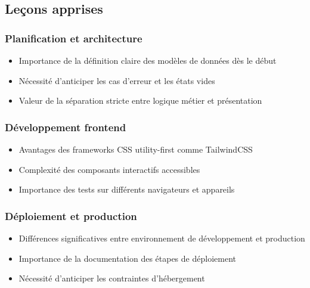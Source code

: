 \documentclass[a4paper,11pt]{article}
\begin{document}
        \subsection{Leçons apprises}

            \subsubsection{Planification et architecture}
                \begin{itemize}
                    \item Importance de la définition claire des modèles de données dès le début
                    \item Nécessité d'anticiper les cas d'erreur et les états vides
                    \item Valeur de la séparation stricte entre logique métier et présentation
                \end{itemize}

            \subsubsection{Développement frontend}
                \begin{itemize}
                    \item Avantages des frameworks CSS utility-first comme TailwindCSS
                    \item Complexité des composants interactifs accessibles
                    \item Importance des tests sur différents navigateurs et appareils
                \end{itemize}

            \subsubsection{Déploiement et production}
                \begin{itemize}
                    \item Différences significatives entre environnement de développement et production
                    \item Importance de la documentation des étapes de déploiement
                    \item Nécessité d'anticiper les contraintes d'hébergement
                \end{itemize}

    
\end{document}
